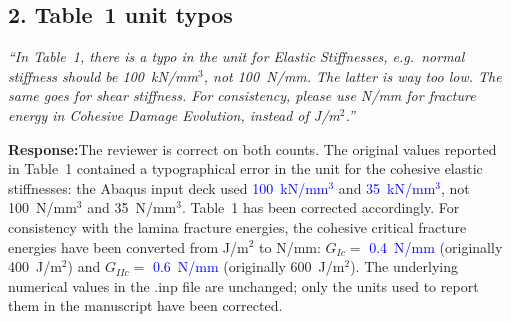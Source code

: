 \documentclass[11pt,a4paper]{article}
\newcommand{\new}[1]{\textcolor{blue}{#1}}
\newcommand{\rev}[1]{\par\noindent\textit{\small #1}\par\smallskip}
\newcommand{\resp}{\par\noindent\textbf{Response:}\space}
\begin{document}
\subsection*{2. Table~1 unit typos}
\rev{``In Table~1, there is a typo in the unit for Elastic Stiffnesses, e.g.\ normal stiffness should be 100~kN/mm$^3$, not 100~N/mm. The latter is way too low. The same goes for shear stiffness. For consistency, please use N/mm for fracture energy in Cohesive Damage Evolution, instead of J/m$^2$.''}
\resp The reviewer is correct on both counts. The original values reported in Table~1 contained a typographical error in the unit for the cohesive elastic stiffnesses: the Abaqus input deck used \new{100~kN/mm$^3$} and \new{35~kN/mm$^3$}, not 100~N/mm$^3$ and 35~N/mm$^3$. Table~1 has been corrected accordingly. For consistency with the lamina fracture energies, the cohesive critical fracture energies have been converted from J/m$^2$ to N/mm: $G_{Ic} = $ \new{0.4~N/mm} (originally 400~J/m$^2$) and $G_{IIc} = $ \new{0.6~N/mm} (originally 600~J/m$^2$). The underlying numerical values in the .inp file are unchanged; only the units used to report them in the manuscript have been corrected.
\end{document}
